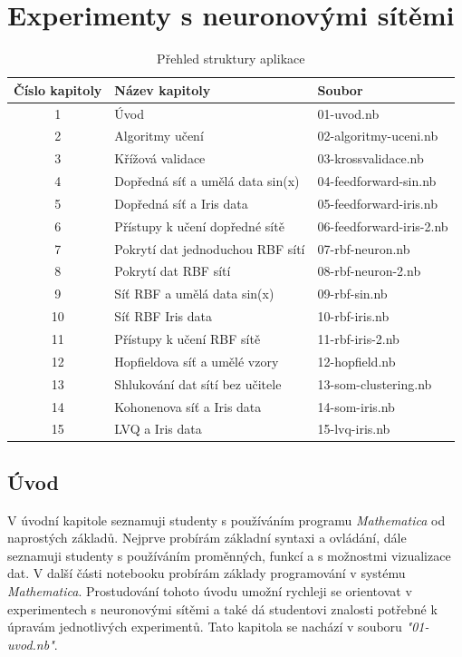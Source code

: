 \documentclass[11pt,twoside,a4paper]{book}
\begin{document}
\chapter{Experimenty s neuronovými sítěmi}

\begin{center}
\begin{table}[h]
\begin{tabular}{|c|l|l|}
\hline 
Číslo kapitoly & Název kapitoly & Soubor \\ \hline
1 & Úvod & 01-uvod.nb \\ \hline
2 & Algoritmy učení & 02-algoritmy-uceni.nb \\ \hline
3 & Křížová validace & 03-krossvalidace.nb \\ \hline
4 & Dopředná síť a umělá data sin(x) & 04-feedforward-sin.nb \\ \hline
5 & Dopředná síť a Iris data & 05-feedforward-iris.nb \\ \hline
6 & Přístupy k učení dopředné sítě & 06-feedforward-iris-2.nb \\ \hline
7 & Pokrytí dat jednoduchou RBF sítí & 07-rbf-neuron.nb \\ \hline
8 & Pokrytí dat RBF sítí & 08-rbf-neuron-2.nb \\ \hline
9 & Síť RBF a umělá data sin(x) & 09-rbf-sin.nb \\ \hline
10 & Síť RBF  Iris data & 10-rbf-iris.nb \\ \hline
11 & Přístupy k učení RBF sítě & 11-rbf-iris-2.nb \\ \hline
12 & Hopfieldova síť a umělé vzory & 12-hopfield.nb \\ \hline
13 & Shlukování dat sítí bez učitele & 13-som-clustering.nb \\ \hline
14 & Kohonenova síť a Iris data & 14-som-iris.nb \\ \hline
15 & LVQ a Iris data & 15-lvq-iris.nb \\ \hline
\end{tabular}
\caption{Přehled struktury aplikace}
\label{tab:aplikace}
\end{table}
\end{center}

\section{Úvod}
V úvodní kapitole seznamuji studenty s používáním programu \textit{Mathematica} od naprostých základů. Nejprve probírám základní syntaxi a ovládání, dále seznamuji studenty s používáním proměnných, funkcí a s možnostmi vizualizace dat. V další části notebooku probírám základy programování v systému \textit{Mathematica}. Prostudování tohoto úvodu umožní rychleji se orientovat v experimentech s neuronovými sítěmi a také dá studentovi znalosti potřebné k úpravám jednotlivých experimentů. Tato kapitola se nachází v souboru \textit{"01-uvod.nb"}.
\end{document}
